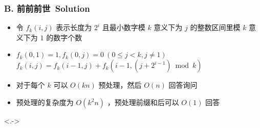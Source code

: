 \documentclass[notheorems]{beamer}
\newcommand{\zhProbB}{前前前世}		\newcommand{\AuthProbB}{\textbf{\underline{\href{http://codeforces.com/profile/EZ_fwtt08}{ez\_fwtt08}}}}
\begin{document}
\begin{frame}
\frametitle{B. \zhProbB\ Solution}
\begin{spacing}{2.0} \large
\begin{itemize}[<+->]
\item 令 $f_k(i, j)$ 表示长度为 $2^i$ 且最小数字模 $k$ 意义下为 $j$ 的\alert{整数区间}里模 $k$ 意义下为 $1$ 的数字个数
\item $f_k(0, 1) = 1, f_k(0, j) = 0\ (0 \leq j < k, j \neq 1)$
\\ $f_k(i, j) = f_k(i - 1, j) + f_k(i - 1, (j + 2^{i - 1}) \bmod k)$
\item 对于每个 $k$ 可以 $O(k n)$ 预处理，然后 $O(n)$ 回答询问
\item 预处理的复杂度为 $O(k^2 n)$ ，预处理前缀和后可以 $O(1)$ 回答
\end{itemize}
\end{spacing}
\visible<.->{\hyperlink{Overview}{}}
\end{frame}
\end{document}

